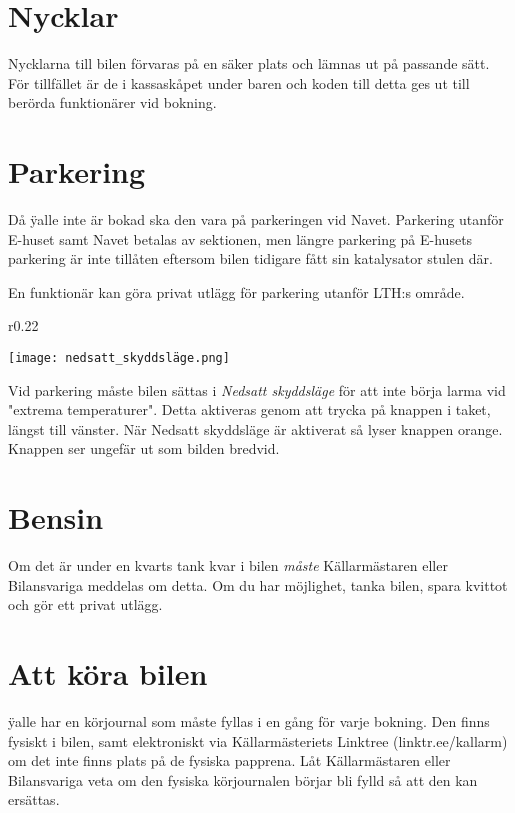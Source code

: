 \documentclass{dsekprotokoll}
\begin{document}
\section{Nycklar}
Nycklarna till bilen förvaras på en säker plats och lämnas ut på passande sätt. För tillfället är de i kassaskåpet under baren och koden till detta ges ut till berörda funktionärer vid bokning.

\section{Parkering}

Då \"yalle inte är bokad ska den vara på parkeringen vid Navet. Parkering utanför E-huset samt Navet betalas av sektionen, men längre parkering på E-husets parkering är inte tillåten eftersom bilen tidigare fått sin katalysator stulen där. 

En funktionär kan göra privat utlägg för parkering utanför LTH:s område. 

\begin{wrapfigure}[3]{r}{0.22\textwidth}
    \raggedright
    \vspace{-0.6cm}
    \texttt{[image: nedsatt\_skyddsläge.png]}
\end{wrapfigure}

Vid parkering måste bilen sättas i \emph{Nedsatt skyddsläge} för att inte börja larma vid "extrema temperaturer". Detta aktiveras genom att trycka på knappen i taket, längst till vänster. När Nedsatt skyddsläge är aktiverat så lyser knappen orange. Knappen ser ungefär ut som bilden bredvid.

\section{Bensin} 
Om det är under en kvarts tank kvar i bilen \emph{måste} Källarmästaren eller Bilansvariga meddelas om detta. Om du har möjlighet, tanka bilen, spara kvittot och gör ett privat utlägg.

\section{Att köra bilen} 

\"yalle har en körjournal som måste fyllas i en gång för varje bokning. Den finns fysiskt i bilen, samt elektroniskt via Källarmästeriets Linktree (linktr.ee/kallarm) om det inte finns plats på de fysiska papprena. Låt Källarmästaren eller Bilansvariga veta om den fysiska körjournalen börjar bli fylld så att den kan ersättas. 
\end{document}
